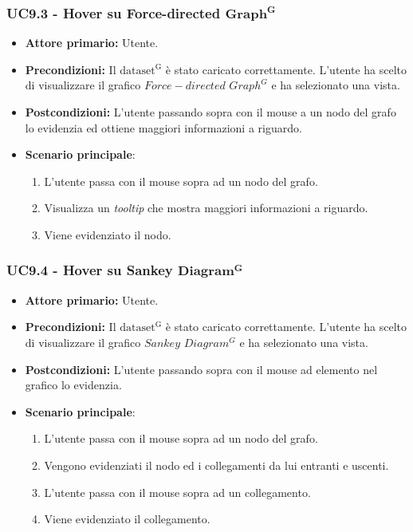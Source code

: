 \subsubsection{UC9.3 - Hover su Force-directed ${\mathbf{Graph^{G}}}$}
\label{sec:UC9.3}
\begin{itemize}
    \item \textbf{Attore primario:} Utente.
    \item \textbf{Precondizioni:} Il ${\mathrm{dataset^{G}}}$ è stato caricato correttamente. L'utente ha scelto di visualizzare il grafico $Force-directed$ $Graph^{G}$ e ha selezionato una vista.
    \item \textbf{Postcondizioni:} L'utente passando sopra con il mouse a un nodo del grafo lo evidenzia ed ottiene maggiori informazioni a riguardo.
    \item \textbf{Scenario principale}:
    \begin{enumerate}
		\item L'utente passa con il mouse sopra ad un nodo del grafo.
		\item Visualizza un \textit{tooltip} che mostra maggiori informazioni a riguardo.
		\item Viene evidenziato il nodo.
	\end{enumerate}
\end{itemize}

\subsubsection{UC9.4 - Hover su Sankey ${\mathbf{Diagram^{G}}}$}
\label{sec:UC9.4}
\begin{itemize}
    \item \textbf{Attore primario:} Utente.
    \item \textbf{Precondizioni:} Il ${\mathrm{dataset^{G}}}$ è stato caricato correttamente. L'utente ha scelto di visualizzare il grafico $Sankey$ $Diagram^{G}$ e ha selezionato una vista.
    \item \textbf{Postcondizioni:} L'utente passando sopra con il mouse ad elemento nel grafico lo evidenzia.
    \item \textbf{Scenario principale}: 
    \begin{enumerate}
		\item L'utente passa con il mouse sopra ad un nodo del grafo.
		\item Vengono evidenziati il nodo ed i collegamenti da lui entranti e uscenti.
		\item L'utente passa con il mouse sopra ad un collegamento.
		\item Viene evidenziato il collegamento.
	\end{enumerate}
\end{itemize}

